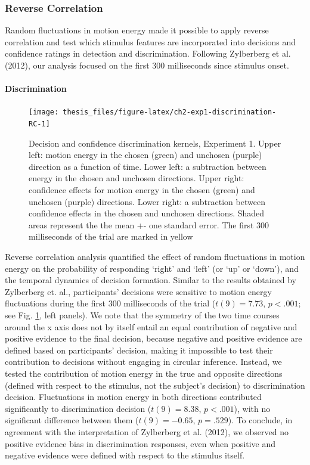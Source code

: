 \documentclass[12pt,twoside]{reedthesis}
\begin{document}
\hypertarget{reverse-correlation}{%
\subsubsection{Reverse Correlation}\label{reverse-correlation}}

Random fluctuations in motion energy made it possible to apply reverse correlation and test which stimulus features are incorporated into decisions and confidence ratings in detection and discrimination. Following Zylberberg et al. (2012), our analysis focused on the first 300 milliseconds since stimulus onset.

\hypertarget{e2-disc-RC}{%
\paragraph{Discrimination}\label{e2-disc-RC}}
\begin{figure}
\texttt{[image: thesis\_files/figure-latex/ch2-exp1-discrimination-RC-1]} \caption[Reverse correlation of discrimination trials, Exp. 1]{Decision and confidence discrimination kernels, Experiment 1. Upper left: motion energy in the chosen (green) and unchosen (purple) direction as a function of time. Lower left: a subtraction between energy in the chosen and unchosen directions. Upper right: confidence effects for motion energy in the chosen (green) and unchosen (purple) directions. Lower right: a subtraction between confidence effects in the chosen and unchosen directions. Shaded areas represent the the mean +- one standard error. The first 300 milliseconds of the trial are marked in yellow}\label{fig:ch2-exp1-discrimination-RC}
\end{figure}
Reverse correlation analysis quantified the effect of random fluctuations in motion energy on the probability of responding `right' and `left' (or `up' or `down'), and the temporal dynamics of decision formation. Similar to the results obtained by Zylberberg et. al., participants' decisions were sensitive to motion energy fluctuations during the first 300 milliseconds of the trial (\(t(9) = 7.73\), \(p < .001\); see Fig. \ref{fig:ch2-exp1-discrimination-RC}, left panels). We note that the symmetry of the two time courses around the x axis does not by itself entail an equal contribution of negative and positive evidence to the final decision, because negative and positive evidence are defined based on participants' decision, making it impossible to test their contribution to decisions without engaging in circular inference. Instead, we tested the contribution of motion energy in the true and opposite directions (defined with respect to the stimulus, not the subject's decision) to discrimination decision. Fluctuations in motion energy in both directions contributed significantly to discrimination decision (\(t(9) = 8.38\), \(p < .001\)), with no significant difference between them (\(t(9) = -0.65\), \(p = .529\)). To conclude, in agreement with the interpretation of Zylberberg et al. (2012), we observed no positive evidence bias in discrimination responses, even when positive and negative evidence were defined with respect to the stimulus itself.
\end{document}
